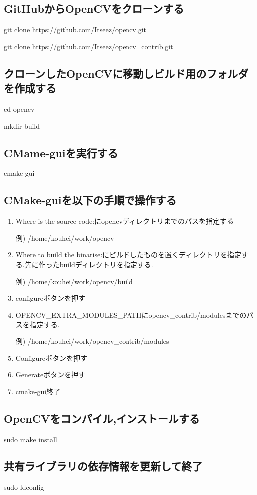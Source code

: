 \documentclass[12pt,oneside]{sotsuken_paper}
\begin{document}
\subsection{GitHubからOpenCVをクローンする}

git clone https://github.com/Itseez/opencv.git

git clone https://github.com/Itseez/opencv\_contrib.git

\subsection{クローンしたOpenCVに移動しビルド用のフォルダを作成する}

cd opencv

mkdir build

\subsection{CMame-guiを実行する}
cmake-gui

\subsection{CMake-guiを以下の手順で操作する}

\begin{enumerate}
\item Where is the source code:にopencvディレクトリまでのパスを指定する

例) /home/kouhei/work/opencv

\item Where to build the binarise:にビルドしたものを置くディレクトリを指定する.先に作ったbuildディレクトリを指定する.

例) /home/kouhei/work/opencv/build

\item configureボタンを押す

\item OPENCV\_EXTRA\_MODULES\_PATHにopencv\_contrib/modulesまでのパスを指定する.

例) /home/kouhei/work/opencv\_contrib/modules

\item Configureボタンを押す

\item Generateボタンを押す

\item cmake-gui終了

\end{enumerate}

\subsection{OpenCVをコンパイル,インストールする}

sudo make install

\subsection{共有ライブラリの依存情報を更新して終了}

sudo ldconfig

\newpage


\end{document}
